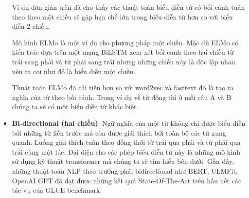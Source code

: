 \begin{itemize}
          Ví dụ đơn giản trên đã cho thấy các thuật toán biểu diễn từ có bối cảnh tuân theo theo một chiều sẽ gặp hạn chế lớn trong biểu diễn từ hơn so với biểu diễn 2 chiều.

          Mô hình ELMo là một ví dụ cho phương pháp một chiều. Mặc dù ELMo có kiến trúc dựa trên một mạng BiLSTM xem xét bối cảnh theo hai chiều từ trái sang phải và từ phải sang trái nhưng những chiều này là độc lập nhau nên ta coi như đó là biểu diễn một chiều.

          Thuật toán ELMo đã cải tiến hơn so với word2vec và fasttext đó là tạo ra nghĩa của từ theo bối cảnh. Trong ví dụ về từ đồng thì ở mỗi câu A và B chúng ta sẽ có một biểu diễn từ khác biệt.

    \item \textbf{Bi-directional (hai chiều)}: Ngữ nghĩa của một từ không chỉ được biểu diễn bởi những từ liền trước mà còn được giải thích bởi toàn bộ các từ xung quanh. Luồng giải thích tuân theo đồng thời từ trái qua phải và từ phải qua trái cùng một lúc. Đại diện cho các phép biểu diễn từ này là những mô hình sử dụng kỹ thuật transformer mà chúng ta sẽ tìm hiểu bên dưới. Gần đây, những thuật toán NLP theo trường phái bidirectional như BERT, ULMFit, OpenAI GPT đã đạt được những kết quả State-Of-The-Art trên hầu hết các tác vụ của GLUE benchmark.
\end{itemize}
